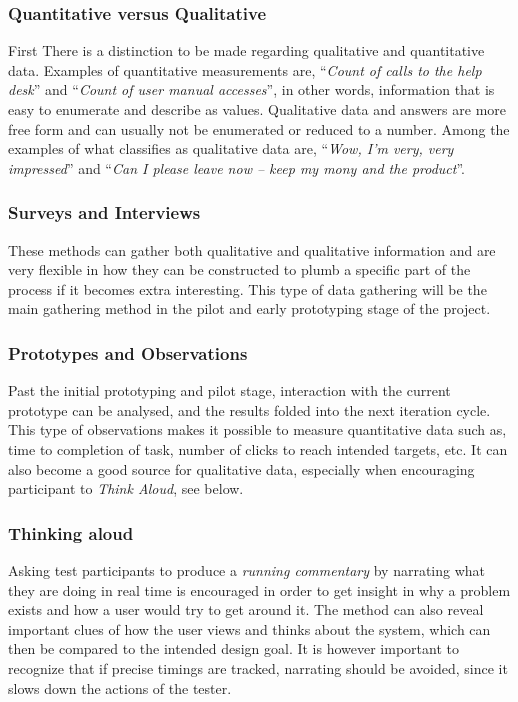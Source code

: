 \documentclass[10pt]{article}
\newcommand{\myenquote}[1]{\enquote{\itshape#1}}
\begin{document}
    \subsubsection{Quantitative versus Qualitative}
      First There is a distinction to be made regarding qualitative and
      quantitative data. Examples of quantitative measurements are,
      \myenquote{Count of calls to the help desk} and \myenquote{Count of user
        manual accesses}\cite[p.89]{c_handbook_usability}, in other words,
      information that is easy to enumerate and describe as values. Qualitative
      data and answers are more free form and can usually not be enumerated or
      reduced to a number. Among the examples of what classifies as qualitative
      data are,
      \myenquote{Wow, I'm very, very impressed} and
      \myenquote{Can I please leave now -- keep my mony and the
        product}\cite[p.90]{c_handbook_usability}.

    \subsubsection{Surveys and Interviews}
      These methods can gather both qualitative and qualitative information
      and are very flexible in how they can be constructed to plumb a specific
      part of the process if it becomes extra interesting.
      This type of data gathering will be the main gathering method in the
      pilot and early prototyping stage of the project.

    \subsubsection{Prototypes and Observations}
      Past the initial prototyping and pilot stage, interaction with the current
      prototype can be analysed, and the results folded into the next iteration
      cycle. This type of observations makes it possible to measure
      quantitative data such as, time to completion of task, number of clicks
      to reach intended targets, etc. It can also become a good source for
      qualitative data, especially when encouraging participant to
      \textit{Think Aloud}\cite[p.54]{c_handbook_usability}, see below.

    \subsubsection{Thinking aloud}
      Asking test participants to produce a \textit{running commentary}
      by narrating what they are doing in real time is encouraged in order to
      get insight in why a problem exists and how a user would try to get
      around it. The method can also reveal important clues of how the user
      views and thinks about the system, which can then be compared to the
      intended design goal. It is however important to recognize that if
      precise timings are tracked, narrating should be avoided, since it
      slows down the actions of the tester\cite[p.54]{c_handbook_usability}.
\end{document}
